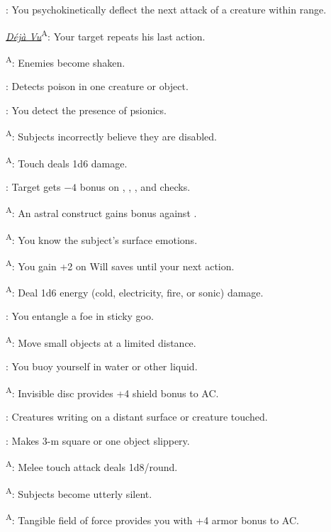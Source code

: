 : You psychokinetically deflect the next attack of a creature within range.

\noindent\textit{\hyperref[psionic:Deja Vu]{Déjà Vu}}\textsuperscript{A}: Your target repeats his last action.

\textsuperscript{A}: Enemies become shaken.

: Detects poison in one creature or object.

: You detect the presence of psionics.

\textsuperscript{A}: Subjects incorrectly believe they are disabled.

\textsuperscript{A}: Touch deals 1d6 damage.

: Target gets $-4$ bonus on , , , and  checks.

\textsuperscript{A}: An astral construct gains bonus against .

\textsuperscript{A}: You know the subject's surface emotions.

\textsuperscript{A}: You gain +2 on Will saves until your next action.

\textsuperscript{A}: Deal 1d6 energy (cold, electricity, fire, or sonic) damage.

: You entangle a foe in sticky goo.

\textsuperscript{A}: Move small objects at a limited distance.

: You buoy yourself in water or other liquid.

\textsuperscript{A}: Invisible disc provides +4 shield bonus to AC.

: Creatures writing on a distant surface or creature touched.

: Makes 3-m square or one object slippery.

\textsuperscript{A}: Melee touch attack deals 1d8/round.

\textsuperscript{A}: Subjects become utterly silent.

\textsuperscript{A}: Tangible field of force provides you with +4 armor bonus to AC.

